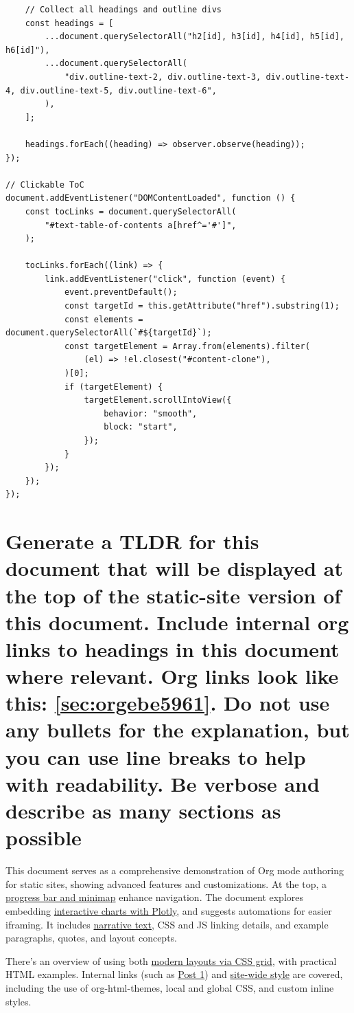 \documentclass[11pt]{article}
\begin{document}
\begin{verbatim}
    // Collect all headings and outline divs
    const headings = [
        ...document.querySelectorAll("h2[id], h3[id], h4[id], h5[id], h6[id]"),
        ...document.querySelectorAll(
            "div.outline-text-2, div.outline-text-3, div.outline-text-4, div.outline-text-5, div.outline-text-6",
        ),
    ];

    headings.forEach((heading) => observer.observe(heading));
});

// Clickable ToC
document.addEventListener("DOMContentLoaded", function () {
    const tocLinks = document.querySelectorAll(
        "#text-table-of-contents a[href^='#']",
    );

    tocLinks.forEach((link) => {
        link.addEventListener("click", function (event) {
            event.preventDefault();
            const targetId = this.getAttribute("href").substring(1);
            const elements = document.querySelectorAll(`#${targetId}`);
            const targetElement = Array.from(elements).filter(
                (el) => !el.closest("#content-clone"),
            )[0];
            if (targetElement) {
                targetElement.scrollIntoView({
                    behavior: "smooth",
                    block: "start",
                });
            }
        });
    });
});
\end{verbatim}
\section{Generate a TLDR for this document that will be displayed at the top of the static-site version of this document.  Include internal org links to headings in this document where relevant. Org links look like this: \ref{sec:orgebe5961}. Do not use any bullets for the explanation, but you can use line breaks to help with readability.  Be verbose and describe as many sections as possible}
\label{sec:org31a3af4}
This document serves as a comprehensive demonstration of Org mode authoring for static sites, showing advanced features and customizations. At the top, a \hyperref[sec:org54bfe29]{progress bar and minimap} enhance navigation. The document explores embedding \hyperref[sec:org3a05e6d]{interactive charts with Plotly}, and suggests automations for easier iframing. It includes \hyperref[sec:orge9eeec2]{narrative text}, CSS and JS linking details, and example paragraphs, quotes, and layout concepts.

There's an overview of using both \hyperref[sec:org21bb650]{modern layouts via CSS grid}, with practical HTML examples. Internal links (such as \href{post1.html}{Post 1}) and \hyperref[sec:orgd5f68b8]{site-wide style} are covered, including the use of org-html-themes, local and global CSS, and custom inline styles. 
\end{document}
